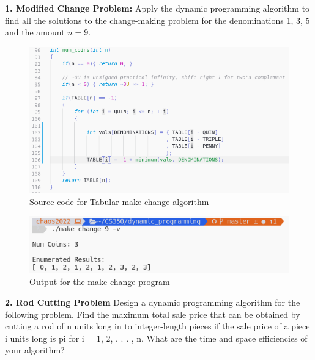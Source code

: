 \documentclass[11pt,letterpaper]{report}
\begin{document}
\ifdefined \LF
{\Large     %
\fi

  \noindent\textbf{1. Modified Change Problem:}
  Apply the dynamic programming algorithm to find all the solutions to the change-making 
  problem for the denominations 1, 3, 5 and the amount $n = 9$.

  \begin{figure}[h!]
	\centering
	\includegraphics[width=1\linewidth]{num_coins.png}
	\caption[cs350]{Source code for Tabular make change algorithm}
	\label{fig:P1compileP0-1}
  \end{figure}

  \begin{figure}[h!]
	\centering
	\includegraphics[width=1\linewidth]{num_coins_output.png}
	\caption[cs350]{Output for the make change program}
	\label{fig:P1compileP0-1}
  \end{figure}

  \pagebreak

  \noindent\textbf{2. Rod Cutting Problem}
  Design a dynamic programming algorithm for the following problem. Find the maximum 
  total sale price that can be obtained by cutting a rod of n units long in to 
  integer-length pieces if the sale price of a piece i units long is pi for i = 1, 2, 
  . . . , n.  What are the time and space efficiencies of your algorithm?

}
\end{document}
